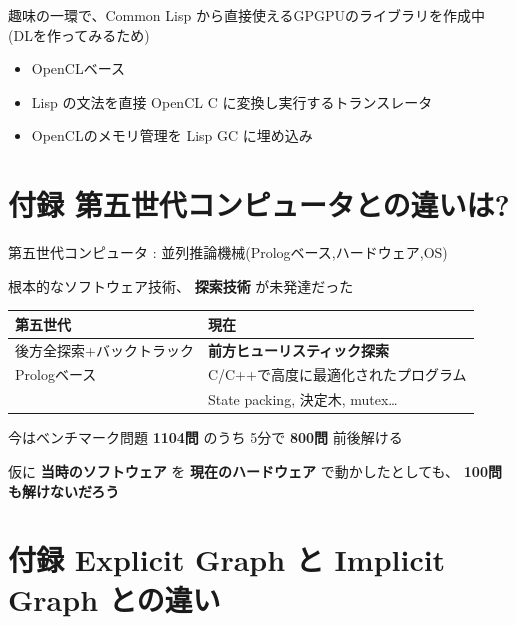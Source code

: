 趣味の一環で、Common Lisp から直接使えるGPGPUのライブラリを作成中 (DLを作ってみるため)

\begin{itemize}
\item OpenCLベース
\item Lisp の文法を直接 OpenCL C に変換し実行するトランスレータ
\item OpenCLのメモリ管理を Lisp GC に埋め込み
\end{itemize}

\section{付録 第五世代コンピュータとの違いは?}
\label{sec-12}

第五世代コンピュータ : 並列推論機械(Prologベース,ハードウェア,OS)

根本的なソフトウェア技術、 \textbf{探索技術} が未発達だった

\begin{center}
\begin{tabular}{ll}
第五世代 & 現在\\
\hline
後方全探索+バックトラック & \textbf{前方ヒューリスティック探索}\\
Prologベース & C/C++で高度に最適化されたプログラム\\
 & State packing, 決定木, mutex\ldots{}\\
\end{tabular}
\end{center}

今はベンチマーク問題 \textbf{1104問} のうち 5分で \textbf{800問} 前後解ける

仮に \textbf{当時のソフトウェア} を \textbf{現在のハードウェア} で動かしたとしても、 \textbf{100問も解けないだろう}

\section{付録 Explicit Graph と Implicit Graph との違い}
\label{sec-13}



